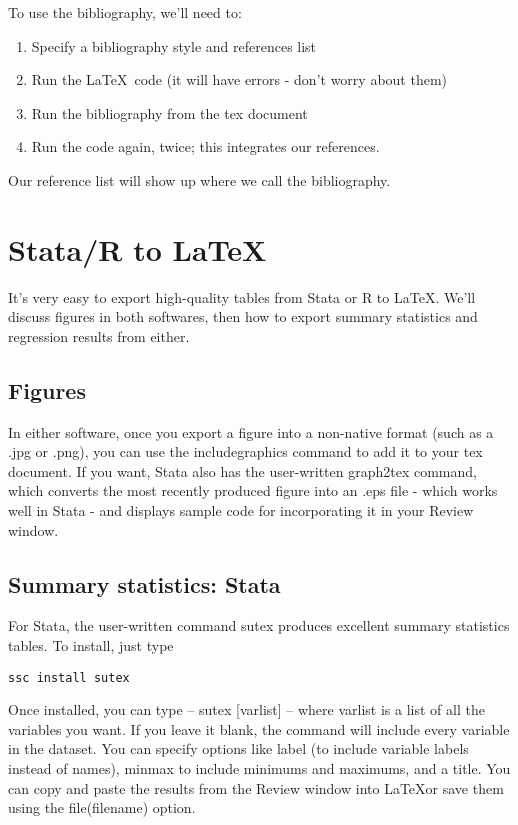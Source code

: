 \documentclass{article}
\begin{document}
To use the bibliography, we'll need to:
\begin{enumerate} 
	\item Specify a bibliography style and references list
	\item Run the \LaTeX\ code (it will have errors - don't worry about them)
	\item Run the bibliography from the tex document
	\item Run the code again, twice; this integrates our references. 
\end{enumerate}	
	
Our reference list will show up where we call the bibliography.




\section{Stata/R to \LaTeX}

It's very easy to export high-quality tables from Stata or R to \LaTeX. We'll discuss figures in both softwares, then how to export summary statistics and regression results from either.

\subsection{Figures}

In either software, once you export a figure into a non-native format (such as a .jpg or .png), you can use the includegraphics command to add it to your tex document. If you want, Stata also has the user-written graph2tex command, which converts the most recently produced figure into an .eps file - which works well in Stata - and displays sample code for incorporating it in your Review window. 

\subsection{Summary statistics: Stata}

For Stata, the user-written command sutex produces excellent summary statistics tables. To install, just type
\begin{verbatim}
ssc install sutex
\end{verbatim}

Once installed, you can type -- sutex [varlist] -- where varlist is a list of all the variables you want. If you leave it blank, the command will include every variable in the dataset. You can specify options like label (to include variable labels instead of names), minmax to include minimums and maximums, and a title. You can copy and paste the results from the Review window into \LaTeX or save them using the file(filename) option.
\end{document}
